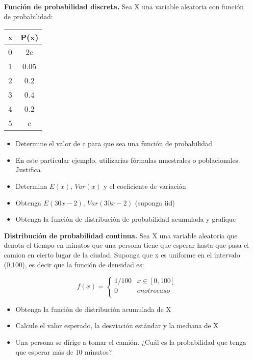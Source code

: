 \documentclass{oxmathproblems}
\begin{document}
\begin{questions}
\miquestion \textbf{Función de probabilidad discreta.} Sea X una variable aleatoria con función de probabilidad:

\begin{center}
\begin{tabular}{ |c|c| } 
 \hline
 \textbf{x} & \textbf{P(x)} \\ 
 \hline
 0 & 2c \\ 
 1 & 0.05 \\ 
 2 & 0.2 \\ 
 3 & 0.4 \\ 
 4 & 0.2 \\ 
 5 & c \\ 
 \hline
\end{tabular}
\end{center}

\begin{itemize}
\item Determine el valor de c para que sea una función de probabilidad
\item En este particular ejemplo, utilizarías fórmulas muestrales o poblacionales. Justifica
\item Determina $E(x)$, $Var(x)$ y el coeficiente de variación
\item Obtenga $E(30x-2)$, $Var(30x-2)$ (suponga iid)
\item Obtenga la función de distribución de probabilidad acumulada y grafique
\end{itemize}

\miquestion \textbf{Distribución de probabilidad continua.} Sea X una variable aleatoria que denota el tiempo en minutos que una persona tiene que esperar hasta que pasa el camion en cierto lugar de la ciudad. Suponga que x es uniforme en el intervalo (0,100), es decir que la función de densidad es:


$$
f(x) = \begin{cases}  
1/100 & x \in [0,100] \\
0 & en otro caso \\
 \end{cases}
 $$


\begin{itemize}
\item Obtenga la función de distribución acumulada de X
\item Calcule el valor esperado, la desviación estándar y la mediana de X
\item Una persona se dirige a tomar el camión. ¿Cuál es la probabilidad que tenga que esperar más de 10 minutos?
\end{itemize}



\end{questions}
\end{document}

